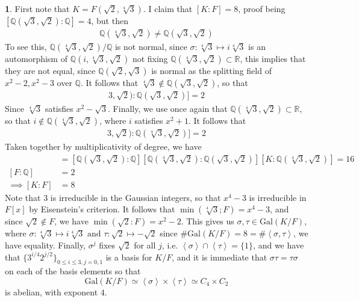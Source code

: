 \documentclass[11pt]{article}
\theoremstyle{definition}
\newtheorem{pb}{}
\newcommand{\set}[1]{\{#1\}}
\newcommand{\gen}[1]{\left\langle #1 \right\rangle}
\newcommand{\tand}{\text{ and }}
\newcommand{\gal}{\text{Gal}}
\begin{document}
    \begin{pb}
        First note that \(K = F(\sqrt{2},\sqrt[4]{3})\). I claim that \([K:F] = 8\), proof being
        \([\mathbb{Q}(\sqrt{3},\sqrt{2}):\mathbb{Q}] = 4\), but then
        \begin{align*}
           \mathbb{Q}(\sqrt[4]{3},\sqrt{2}) \neq \mathbb{Q}(\sqrt{3},\sqrt{2})
        \end{align*}
        To see this, \(\mathbb{Q}(\sqrt[4]{3},\sqrt{2})/\mathbb{Q}\) is not normal, since \(\sigma: \sqrt[4]{3} \mapsto i \sqrt[4]{3}\) is an automorphism of \(\mathbb{Q}(i,\sqrt[4]{3},\sqrt{2})\) not fixing \(\mathbb{Q}(\sqrt[4]{3},\sqrt{2}) \subset \mathbb{R}\), this implies that they are not equal, since \(\mathbb{Q}(\sqrt{2},\sqrt{3})\) is normal as the splitting field of \(x^2-2, x^2-3\) over \(\mathbb{Q}\). It follows that \(\sqrt[4]{3} \not \in \mathbb{Q}(\sqrt{3},\sqrt{2})\), so that
        \begin{align*}
            [\mathbb{Q}(\sqrt[4]{3},\sqrt{2}):\mathbb{Q}(\sqrt{3},\sqrt{2})] = 2
        \end{align*}
        Since \(\sqrt[4]{3}\) satisfies \(x^2 - \sqrt{3}\). Finally, we use once again that \(\mathbb{Q}(\sqrt[4]{3},\sqrt{2}) \subset \mathbb{R}\), so that \(i \not \in \mathbb{Q}(\sqrt[4]{3},\sqrt{2})\), where \(i\) satisfies \(x^2 + 1\). It follows that
        \begin{align*}
            [F(\sqrt[4]{3},\sqrt{2}):\mathbb{Q}(\sqrt[4]{3},\sqrt{2})] = 2
        \end{align*}
        Taken together by multiplicativity of degree, we have
        \begin{align*}
            [K:\mathbb{Q}] &= [\mathbb{Q}(\sqrt{3},\sqrt{2}):\mathbb{Q}][\mathbb{Q}(\sqrt[4]{3},\sqrt{2}):\mathbb{Q}(\sqrt{3},\sqrt{2})][K:\mathbb{Q}(\sqrt[4]{3},\sqrt{2})] = 16 \\
            [F:\mathbb{Q}] &= 2 \\
            \implies [K:F] &= 8
        \end{align*}
        Note that \(3\) is irreducible in the Gaussian integers, so that \(x^4 - 3\) is irreducible in \(F[x]\) by Eisenstein's criterion. It follows that \(\min(\sqrt[4]{3};F) = x^4 - 3\), and since \(\sqrt{2} \not \in F\), we have \(\min(\sqrt{2}:F) = x^2 - 2\). This gives us \(\sigma,\tau \in \gal(K/F)\), where \(\sigma: \sqrt[4]{3} \mapsto i\sqrt[4]{3} \tand \tau: \sqrt{2} \mapsto - \sqrt{2}\) since \(\# \gal(K/F) = 8 = \# \gen{\sigma,\tau}\), we have equality. Finally, \(\sigma^j\) fixes \(\sqrt{2}\) for all \(j\), i.e. \(\gen{\sigma} \cap \gen{\tau} = \set{1}\), and we have that \(\set{3^{i/4}2^{j/2}}_{0 \leq i \leq 3, j = 0,1}\) is a basis for \(K/F\), and it is immediate that \(\sigma\tau = \tau\sigma\) on each of the basis elements so that \[\gal(K/F) \simeq \gen{\sigma} \times \gen{\tau} \simeq C_4 \times C_2\] is abelian, with exponent \(4\).

\end{pb}
\end{document}
